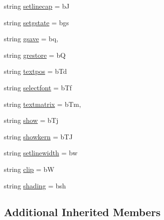 \begin{DoxyCompactItemize}
string \hyperlink{classmatplotlib_1_1backends_1_1backend__pdf_1_1Op_a90c18275ec6a53bd1fdc91639893ebbf}{setlinecap} = b\textquotesingle{}J\textquotesingle{}
\item 
string \hyperlink{classmatplotlib_1_1backends_1_1backend__pdf_1_1Op_a9489cce186692f592f663702d685f38b}{setgstate} = b\textquotesingle{}gs\textquotesingle{}
\item 
string \hyperlink{classmatplotlib_1_1backends_1_1backend__pdf_1_1Op_aeb66d89bde219063f692d18908a4f601}{gsave} = b\textquotesingle{}q\textquotesingle{},
\item 
string \hyperlink{classmatplotlib_1_1backends_1_1backend__pdf_1_1Op_aea6620e2dcf36a997e52c55699d0fc26}{grestore} = b\textquotesingle{}Q\textquotesingle{}
\item 
string \hyperlink{classmatplotlib_1_1backends_1_1backend__pdf_1_1Op_aa8353049f92b25d56d97778c6370f8c6}{textpos} = b\textquotesingle{}Td\textquotesingle{}
\item 
string \hyperlink{classmatplotlib_1_1backends_1_1backend__pdf_1_1Op_a1cf5283446cae2e491e2f27bca25d1fb}{selectfont} = b\textquotesingle{}Tf\textquotesingle{}
\item 
string \hyperlink{classmatplotlib_1_1backends_1_1backend__pdf_1_1Op_ab2613db01bf650fb8017bfb454de22c7}{textmatrix} = b\textquotesingle{}Tm\textquotesingle{},
\item 
string \hyperlink{classmatplotlib_1_1backends_1_1backend__pdf_1_1Op_aa1a2439464362d3aef7b653743b5482c}{show} = b\textquotesingle{}Tj\textquotesingle{}
\item 
string \hyperlink{classmatplotlib_1_1backends_1_1backend__pdf_1_1Op_a6534772c8d1f8444e5be3ec099828002}{showkern} = b\textquotesingle{}TJ\textquotesingle{}
\item 
string \hyperlink{classmatplotlib_1_1backends_1_1backend__pdf_1_1Op_ac46373f9070bb5f5955944dd62d357d6}{setlinewidth} = b\textquotesingle{}w\textquotesingle{}
\item 
string \hyperlink{classmatplotlib_1_1backends_1_1backend__pdf_1_1Op_a22889f783b3c09344dff6966247db10f}{clip} = b\textquotesingle{}W\textquotesingle{}
\item 
string \hyperlink{classmatplotlib_1_1backends_1_1backend__pdf_1_1Op_a6af73ba3db70c59c41b8a7ddad950944}{shading} = b\textquotesingle{}sh\textquotesingle{}
\end{DoxyCompactItemize}
\subsection*{Additional Inherited Members}


